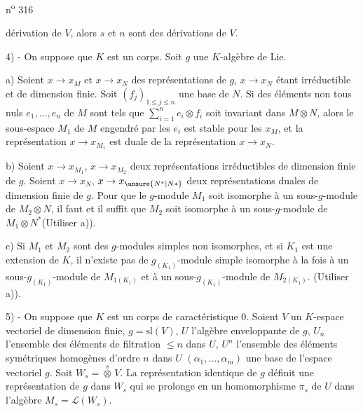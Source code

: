
\hfill n\textsuperscript{o} 316

dérivation de $V$, alors $s$ et $n$ sont des dérivations de $V$.

4) - On suppose que $K$ est un corps. Soit $g$ une $K$-algèbre de Lie.

a) Soient $x\longrightarrow x_M$ et $x\longrightarrow x_N$ des représentations de $g$, $x\longrightarrow x_N$ étant irréductible et de dimension finie. Soit $(f_j)_{1\leq j\leq n}$ une base de $N$. Si des éléments non tous nuls $e_1,\ldots,e_n$ de $M$ sont tels que $\sum_{i=1}^{n}e_i\otimes f_i$ soit invariant dans $M\otimes N$, alors le sous-espace $M_1$ de $M$ engendré par les $e_i$ est stable pour les $x_M$, et la représentation $x\longrightarrow x_{M_1}$ est duale de la représentation $x\longrightarrow x_N$.

b) Soient $x\longrightarrow x_{M_1}$, $x\longrightarrow x_{M_2}$ deux représentations irréductibles de dimension finie de $g$. Soient $x\to x_N$, $x\to x_{\unsure{N^*|N*}}$ deux représentations duales de dimension finie\unsure{,|{}} de $g$. Pour que le $g$-module $M_1$ soit isomorphe à un sous-$g$-module de $M_2\otimes N$, il faut et il suffit que $M_2$ soit isomorphe à un sous-$g$-module de $M_1\otimes N^*$(Utiliser a)).

c) Si $M_1$ et $M_2$ sont des $g$-modules simples non isomorphes, et si $K_1$ est une extension de $K$, il n'existe pas de $g_{(K_1)}$-module simple isomorphe à la fois à un sous-$g_{(K_1)}$-module de $M_{1(K_1)}$ et à un sous-$g_{(K_1)}$-module de $M_{2(K_1)}$. (Utiliser a)).

\margin{\handwritten{$\unsure{\pi|\Pi}$}}
5) - On suppose que $K$ est un corps de caractéristique 0. Soient $V$ un $K$-espace vectoriel de dimension finie, $g=\mathrm{sl}(V)$, $U$ l'algèbre enveloppante de $g$, $U_n$ l'ensemble des éléments de filtration $\leq n$ dans $U$, $U^n$ l'ensemble des éléments symétriques homogènes d'ordre $n$ dans $U$ $(\alpha_1,\ldots,\alpha_m)$ une base de l'espace vectoriel $g$. Soit $W_s=\overset{s}{\otimes}\,V$. La représentation identique de $g$ définit une représentation de $g$ dans $W_s$ qui se prolonge en un homomorphisme $\pi_s$ de $U$ dans l'algèbre $M_s=\mathcal{L}(W_s)$.
